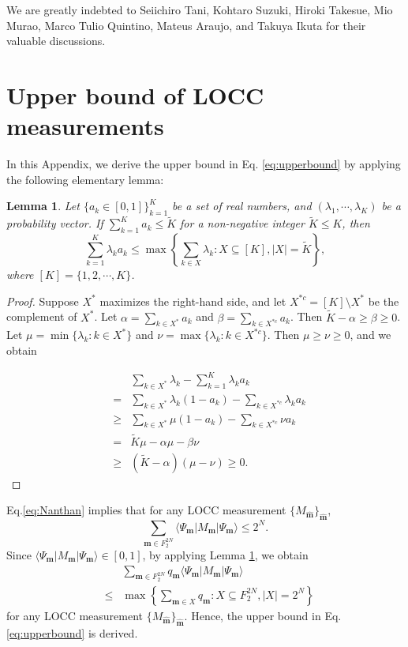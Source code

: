 \documentclass[aps,prx,twocolumn,showpacs,amsmath,notitlepage,amssymb,superscriptaddress]{revtex4-1}
\newcommand{\bra}[1]{\langle {#1} |}
\newcommand{\ket}[1]{| {#1} \rangle}
\newtheorem{lemma}{Lemma}
\begin{document}
\acknowledgements
We are greatly indebted to Seiichiro Tani, Kohtaro Suzuki, Hiroki Takesue, Mio Murao, Marco Tulio Quintino, Mateus Araujo, and Takuya Ikuta for their valuable discussions.

\appendix

\section{Upper bound of LOCC measurements}
\label{appendix:upperbound}
In this Appendix, we derive the upper bound in Eq. \eqref{eq:upperbound} by applying the following elementary lemma:

 \begin{lemma}
 \label{lemma:satprob}
 Let $\{a_k\in[0,1]\}_{k=1}^K$ be a set of real numbers, and $(\lambda_1,\cdots,\lambda_K)$ be a probability vector. If $\sum_{k=1}^K a_k\leq \tilde{K}$ for a non-negative integer $\tilde{K}\leq K$, then
 \begin{equation}
 \sum_{k=1}^K \lambda_ka_k\leq\max\left\{\sum_{k\in X}\lambda_k:X\subseteq [K],|X|= \tilde{K}\right\},
\end{equation}
where $[K]=\{1,2,\cdots,K\}$.
\end{lemma}

\begin{proof}
Suppose $X^*$ maximizes the right-hand side, and let $X^{*c}=[K]\setminus X^*$ be the complement of $X^*$. Let $\alpha=\sum_{k\in X^*}a_k$ and $\beta=\sum_{k\in X^{*c}}a_k$. Then $ \tilde{K}-\alpha\geq\beta\geq 0$. Let $\mu=\min\{\lambda_k:k\in X^*\}$ and $\nu=\max\{\lambda_k:k\in X^{*c}\}$. Then $\mu\geq \nu\geq 0$, and we obtain
 
\begin{eqnarray}
&& \sum_{k\in X^*}\lambda_k-\sum_{k=1}^K \lambda_ka_k\nonumber\\
&=&\sum_{k\in X^*}\lambda_k(1-a_k)-\sum_{k\in X^{*c}}\lambda_ka_k\\
 &\geq&\sum_{k\in X^*}\mu(1-a_k)-\sum_{k\in X^{*c}}\nu a_k\\
 &=&\tilde{K}\mu-\alpha \mu-\beta \nu\\
 &\geq&(\tilde{K}-\alpha)(\mu-\nu)\geq0.
\end{eqnarray}
\end{proof}

Eq.\eqref{eq:Nanthan} implies that for any LOCC measurement $\{M_{\hat{\mathbf{m}}}\}_{\hat{\mathbf{m}}}$,
\begin{equation}
 \sum_{\mathbf{m}\in F_2^{2N}}\bra{\Psi_{\mathbf{m}}}M_{\mathbf{m}}\ket{\Psi_{\mathbf{m}}}\leq 2^N.
\end{equation}
Since $\bra{\Psi_{\mathbf{m}}}M_{\mathbf{m}}\ket{\Psi_{\mathbf{m}}}\in [0,1]$, by applying Lemma \ref{lemma:satprob}, we obtain
\begin{eqnarray}
 &&\sum_{\mathbf{m}\in F_2^{2N}}q_{\mathbf{m}}\bra{\Psi_{\mathbf{m}}}M_{\mathbf{m}}\ket{\Psi_{\mathbf{m}}}\nonumber\\
 &\leq&\max\left\{\sum_{\mathbf{m}\in X}q_{\mathbf{m}}:X\subseteq F_2^{2N},|X|= 2^N\right\}
\end{eqnarray}
for any LOCC measurement $\{M_{\hat{\mathbf{m}}}\}_{\hat{\mathbf{m}}}$. Hence, the upper bound in Eq. \eqref{eq:upperbound} is derived.
\end{document}
